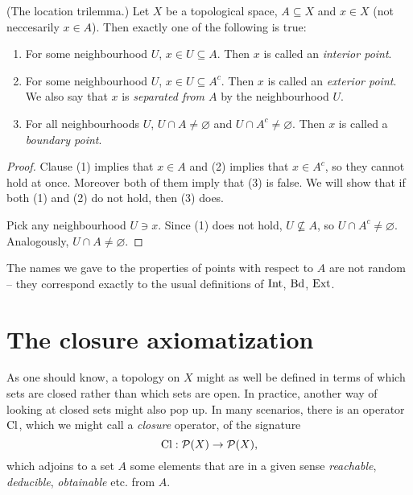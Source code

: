 \begin{lemma}(The location trilemma.)
    Let $X$ be a topological space, $A \subseteq X$ and $x \in X$ (not neccesarily $x \in A$). Then exactly one of the following is true:
    \begin{enumerate}
        \item For some neighbourhood $U$, $x \in U \subseteq A$. Then $x$ is called an \emph{interior point}.
        \item For some neighbourhood $U$, $x \in U \subseteq A^c$. Then $x$ is called an \emph{exterior point}. We also say that $x$ is \emph{separated from $A$} by the neighbourhood $U$.
        \item For all neighbourhoods $U$, $U \cap A \neq \varnothing$ and $U \cap A^c \neq \varnothing$. Then $x$ is called a \emph{boundary point}.
    \end{enumerate}
\end{lemma}

\begin{proof}
    Clause (1) implies that $x \in A$ and (2) implies that $x \in A^c$, so they cannot hold at once. Moreover both of them imply that (3) is false. We will show that if both (1) and (2) do not hold, then (3) does.

    Pick any neighbourhood $U \ni x$. Since (1) does not hold, $U \nsubseteq A$, so $U \cap A^c \neq \varnothing$. Analogously, $U \cap A \neq \varnothing$.
\end{proof}

The names we gave to the properties of points with respect to $A$ are not random -- they correspond exactly to the usual definitions of $\operatorname{Int}$, $\operatorname{Bd}$, $\operatorname{Ext}$. 


\section{The closure axiomatization}

As one should know, a topology on $X$ might as well be defined in terms of which sets are closed rather than which sets are open. In practice, another way of looking at closed sets might also pop up. In many scenarios, there is an operator $\operatorname{Cl}$, which we might call a \emph{closure} operator, of the signature
\[
    \operatorname{Cl}: \mathcal{P}(X) \to \mathcal{P}(X),
\]
which adjoins to a set $A$ some elements that are in a given sense \emph{reachable}, \emph{deducible}, \emph{obtainable} etc. from $A$.


